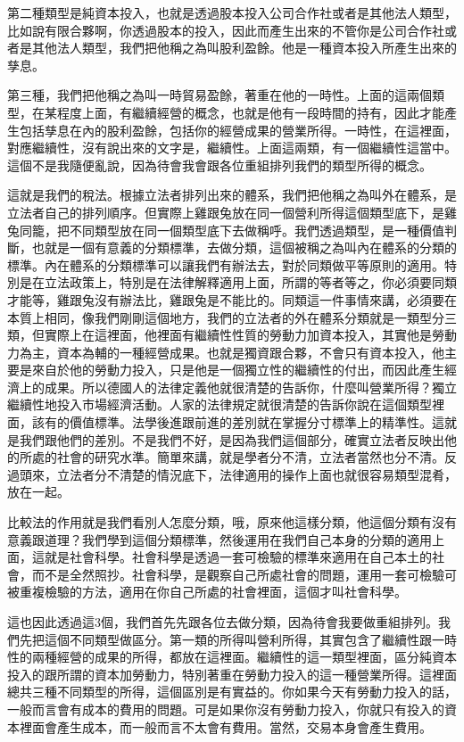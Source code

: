 \documentclass[oneside,sub3section]{ctexbook}
\begin{document}
第二種類型是純資本投入，也就是透過股本投入公司合作社或者是其他法人類型，比如說有限合夥啊，你透過股本的投入，因此而產生出來的不管你是公司合作社或者是其他法人類型，我們把他稱之為叫股利盈餘。他是一種資本投入所產生出來的孳息。

第三種，我們把他稱之為叫一時貿易盈餘，著重在他的一時性。上面的這兩個類型，在某程度上面，有繼續經營的概念，也就是他有一段時間的持有，因此才能產生包括孳息在內的股利盈餘，包括你的經營成果的營業所得。一時性，在這裡面，對應繼續性，沒有說出來的文字是，繼續性。上面這兩類，有一個繼續性這當中。這個不是我隨便亂說，因為待會我會跟各位重組排列我們的類型所得的概念。

這就是我們的稅法。根據立法者排列出來的體系，我們把他稱之為叫外在體系，是立法者自己的排列順序。但實際上雞跟兔放在同一個營利所得這個類型底下，是雞兔同籠，把不同類型放在同一個類型底下去做稱呼。我們透過類型，是一種價值判斷，也就是一個有意義的分類標準，去做分類，這個被稱之為叫內在體系的分類的標準。內在體系的分類標準可以讓我們有辦法去，對於同類做平等原則的適用。特別是在立法政策上，特別是在法律解釋適用上面，所謂的等者等之，你必須要同類才能等，雞跟兔沒有辦法比，雞跟兔是不能比的。同類這一件事情來講，必須要在本質上相同，像我們剛剛這個地方，我們的立法者的外在體系分類就是一類型分三類，但實際上在這裡面，他裡面有繼續性性質的勞動力加資本投入，其實他是勞動力為主，資本為輔的一種經營成果。也就是獨資跟合夥，不會只有資本投入，他主要是來自於他的勞動力投入，只是他是一個獨立性的繼續性的付出，而因此產生經濟上的成果。所以德國人的法律定義他就很清楚的告訴你，什麼叫營業所得？獨立繼續性地投入市場經濟活動。人家的法律規定就很清楚的告訴你說在這個類型裡面，該有的價值標準。法學後進跟前進的差別就在掌握分寸標準上的精準性。這就是我們跟他們的差別。不是我們不好，是因為我們這個部分，確實立法者反映出他的所處的社會的研究水準。簡單來講，就是學者分不清，立法者當然也分不清。反過頭來，立法者分不清楚的情況底下，法律適用的操作上面也就很容易類型混肴，放在一起。

比較法的作用就是我們看別人怎麼分類，哦，原來他這樣分類，他這個分類有沒有意義跟道理？我們學到這個分類標準，然後運用在我們自己本身的分類的適用上面，這就是社會科學。社會科學是透過一套可檢驗的標準來適用在自己本土的社會，而不是全然照抄。社會科學，是觀察自己所處社會的問題，運用一套可檢驗可被重複檢驗的方法，適用在你自己所處的社會裡面，這個才叫社會科學。

這也因此透過這3個，我們首先先跟各位去做分類，因為待會我要做重組排列。我們先把這個不同類型做區分。第一類的所得叫營利所得，其實包含了繼續性跟一時性的兩種經營的成果的所得，都放在這裡面。繼續性的這一類型裡面，區分純資本投入的跟所謂的資本加勞動力，特別著重在勞動力投入的這一種營業所得。這裡面總共三種不同類型的所得，這個區別是有實益的。你如果今天有勞動力投入的話，一般而言會有成本的費用的問題。可是如果你沒有勞動力投入，你就只有投入的資本裡面會產生成本，而一般而言不太會有費用。當然，交易本身會產生費用。
\end{document}
